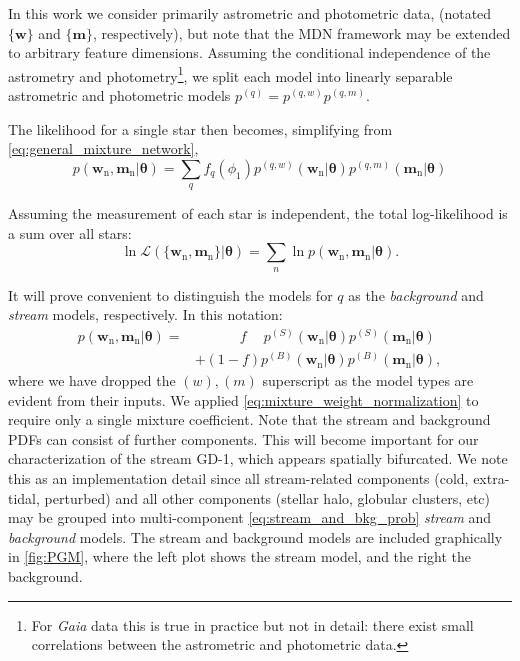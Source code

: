 \documentclass[twocolumn]{aastex631}
\newcommand{\stream}[1]{#1}
\newcommand{\dataarchive}[1]{\textit{#1}}
\newcommand{\Gaia}{\dataarchive{Gaia}}
\newcommand{\mrm}[1]{\mathrm{#1}}
\newcommand{\mbs}[1]{\boldsymbol{#1}}
\newcommand{\mcal}[1]{\mathcal{#1}}
\newcommand{\pdf}{p}
\newcommand{\nth}[1]{{#1}_{\mrm{n}}}  %
\newcommand{\smallcomponent}[2]{#2^{\scriptscriptstyle (#1)}}
\newcommand{\cmp}[2]{\smallcomponent{#1}{#2}}
\newcommand{\Scmp}[1]{\cmp{S}{#1}}
\newcommand{\Bcmp}[1]{\cmp{B}{#1}}
\newcommand{\Spdf}{\Scmp{\pdf}}
\newcommand{\Bpdf}{\Bcmp{\pdf}}
\begin{document}
        In this work we consider primarily astrometric and photometric data,
        (notated $\{\mbs{w}\}$ and $\{\mbs{m}\}$, respectively), but note that
        the MDN framework may be extended to arbitrary feature dimensions.
        Assuming the conditional independence of the astrometry and
        photometry\footnote{ For \Gaia{} data this is true in practice but not
        in detail: there exist small correlations between the astrometric and
        photometric data.}, we split each model into linearly separable
        astrometric and photometric models $\cmp{q}{\pdf} = \cmp{q,w}{\pdf}
        \cmp{q,m}{\pdf}$.

        The likelihood for a single star then becomes, simplifying from
        \autoref{eq:general_mixture_network},
        \begin{equation} \label{eq:general_model}
            \!\!\!\!\! \pdf(\nth{\mbs{w}}, \! \nth{\mbs{m}} | \mbs{\theta})
                \!=\! \sum_{q} \! f_q(\phi_1) \cmp{q,w}{\pdf}(\nth{\mbs{w}}|\mbs{\theta}) \cmp{q,m}{\pdf}(\nth{\mbs{m}}|\mbs{\theta})
        \end{equation}

        Assuming the measurement of each star is independent, the total
        log-likelihood is a sum over all stars:
        \begin{equation} \label{eq:general_likelihood}
            \ln\mcal{L}\left(\{\nth{\mbs{w}},\nth{\mbs{m}}\} | \mbs{\theta}\right) = \sum_n \ln \pdf(\nth{\mbs{w}}, \nth{\mbs{m}} | \mbs{\theta}).
        \end{equation}

        It will prove convenient to distinguish the models for $q$ as the
        \textit{background} and \textit{stream} models, respectively. In this
        notation:
        \begin{align} \label{eq:stream_and_bkg_prob}
            \pdf(\nth{\mbs{w}}, \nth{\mbs{m}} | \mbs{\theta})
            =& \phantom{+} \qquad f \phantom{+} \Spdf(\nth{\mbs{w}}|\mbs{\theta}) \Spdf(\nth{\mbs{m}}|\mbs{\theta}) \\
            & + (1-f) \Bpdf(\nth{\mbs{w}}|\mbs{\theta}) \Bpdf(\nth{\mbs{m}}|\mbs{\theta}), \nonumber
        \end{align}
        where we have dropped the $(w), (m)$ superscript as the model types are
        evident from their inputs. We applied
        \autoref{eq:mixture_weight_normalization} to require only a single
        mixture coefficient.  Note that the stream and background PDFs can
        consist of further components. This will become important for our
        characterization of the stream \stream{GD-1}, which appears spatially
        bifurcated. We note this as an implementation detail since all
        stream-related components (cold, extra-tidal, perturbed) and all other
        components (stellar halo, globular clusters, etc) may be grouped into
        multi-component \autoref{eq:stream_and_bkg_prob} \textit{stream} and
        \textit{background} models.  The stream and background models are
        included graphically in \autoref{fig:PGM}, where the left plot shows the
        stream model, and the right the background.
\end{document}
